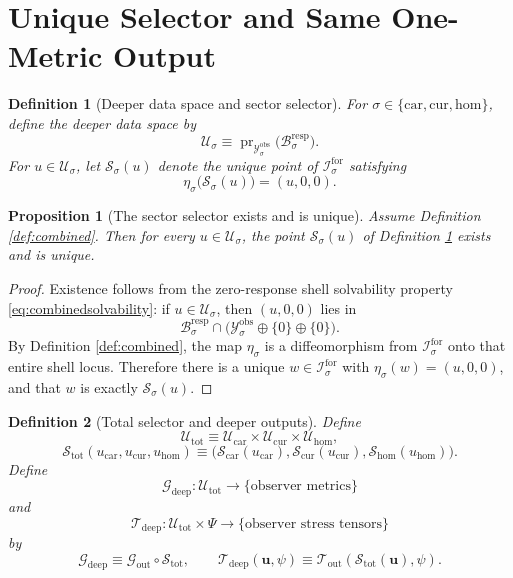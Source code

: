 \documentclass[11pt]{article}
\newcommand{\Car}{\mathrm{car}}
\newcommand{\Cur}{\mathrm{cur}}
\newcommand{\Hom}{\mathrm{hom}}
\newcommand{\ForSpace}[1]{\mathcal I_{#1}^{\mathrm{for}}}
\newcommand{\MetricOut}{\mathscr G_{\mathrm{out}}}
\newcommand{\MatterOut}{\mathscr T_{\mathrm{out}}}
\newcommand{\DeepMetricOut}{\mathscr G_{\mathrm{deep}}}
\newcommand{\DeepMatterOut}{\mathscr T_{\mathrm{deep}}}
\newcommand{\DataSpace}[1]{\mathcal Y_{#1}^{\mathrm{obs}}}
\newcommand{\AmbientEmbed}[1]{\eta_{#1}}
\newcommand{\ResponseImage}[1]{\mathcal B_{#1}^{\mathrm{resp}}}
\newcommand{\DeepSpace}[1]{\mathcal U_{#1}}
\newcommand{\ChainSelect}[1]{\mathcal S_{#1}}
\newcommand{\DeepShell}{\mathcal U_{\mathrm{tot}}}
\newcommand{\ChainSelectTriple}{\mathcal S_{\mathrm{tot}}}
\newtheorem{definition}{Definition}
\newtheorem{proposition}{Proposition}
\begin{document}
\section{Unique Selector and Same One-Metric Output}

\begin{definition}[Deeper data space and sector selector]
\label{def:selector}
For \(\sigma\in\{\Car,\Cur,\Hom\}\), define the deeper data space by
\[
\DeepSpace{\sigma}
\equiv
\operatorname{pr}_{\DataSpace{\sigma}}\bigl(\ResponseImage{\sigma}\bigr).
\]
For \(u\in \DeepSpace{\sigma}\), let \(\ChainSelect{\sigma}(u)\) denote the unique point of \(\ForSpace{\sigma}\) satisfying
\begin{equation}
\AmbientEmbed{\sigma}\bigl(\ChainSelect{\sigma}(u)\bigr)=(u,0,0).
\label{eq:selectordef}
\end{equation}
\end{definition}

\begin{proposition}[The sector selector exists and is unique]
\label{prop:selector}
Assume Definition \ref{def:combined}. Then for every \(u\in \DeepSpace{\sigma}\), the point \(\ChainSelect{\sigma}(u)\) of Definition \ref{def:selector} exists and is unique.
\end{proposition}

\begin{proof}
Existence follows from the zero-response shell solvability property \eqref{eq:combinedsolvability}: if \(u\in\DeepSpace{\sigma}\), then \((u,0,0)\) lies in
\[
\ResponseImage{\sigma}\cap
\bigl(
\DataSpace{\sigma}\oplus\{0\}\oplus\{0\}
\bigr).
\]
By Definition \ref{def:combined}, the map \(\AmbientEmbed{\sigma}\) is a diffeomorphism from \(\ForSpace{\sigma}\) onto that entire shell locus. Therefore there is a unique \(w\in\ForSpace{\sigma}\) with \(\AmbientEmbed{\sigma}(w)=(u,0,0)\), and that \(w\) is exactly \(\ChainSelect{\sigma}(u)\).
\end{proof}

\begin{definition}[Total selector and deeper outputs]
\label{def:deepoutputs}
Define
\[
\DeepShell
\equiv
\DeepSpace{\Car}\times\DeepSpace{\Cur}\times\DeepSpace{\Hom},
\]
\[
\ChainSelectTriple(u_{\Car},u_{\Cur},u_{\Hom})
\equiv
\bigl(
\ChainSelect{\Car}(u_{\Car}),
\ChainSelect{\Cur}(u_{\Cur}),
\ChainSelect{\Hom}(u_{\Hom})
\bigr).
\]
Define
\[
\DeepMetricOut:\DeepShell\to\{\text{observer metrics}\}
\]
and
\[
\DeepMatterOut:\DeepShell\times\Psi\to\{\text{observer stress tensors}\}
\]
by
\begin{equation}
\DeepMetricOut
\equiv
\MetricOut\circ\ChainSelectTriple,
\qquad
\DeepMatterOut(\mathbf u,\psi)
\equiv
\MatterOut(\ChainSelectTriple(\mathbf u),\psi).
\label{eq:deepoutputs}
\end{equation}
\end{definition}
\end{document}
